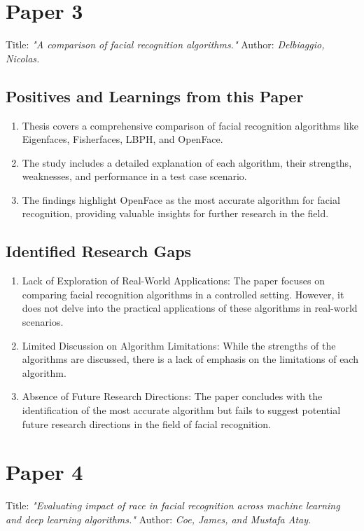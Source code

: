 \documentclass[openany]{report}
\begin{document}
\section{Paper 3}
Title:  \textit{"A comparison of facial recognition algorithms."}
Author:  \textit{Delbiaggio, Nicolas. }
\cite{9}
\subsection{Positives and Learnings from this Paper}
\begin{enumerate}
    \item Thesis covers a comprehensive comparison of facial recognition algorithms like Eigenfaces, Fisherfaces, LBPH, and OpenFace.

    \item The study includes a detailed explanation of each algorithm, their strengths, weaknesses, and performance in a test case scenario.

    \item The findings highlight OpenFace as the most accurate algorithm for facial recognition, providing valuable insights for further research in the field.
\end{enumerate}
\subsection{Identified Research Gaps}
\begin{enumerate}
    \item Lack of Exploration of Real-World Applications: The paper focuses on comparing facial recognition algorithms in a controlled setting. However, it does not delve into the practical applications of these algorithms in real-world scenarios.

    \item Limited Discussion on Algorithm Limitations: While the strengths of the algorithms are discussed, there is a lack of emphasis on the limitations of each algorithm.

    \item Absence of Future Research Directions: The paper concludes with the identification of the most accurate algorithm but fails to suggest potential future research directions in the field of facial recognition.
\end{enumerate}

\section{Paper 4}
Title:  \textit{"Evaluating impact of race in facial recognition across machine learning and deep learning algorithms."}
Author:  \textit{Coe, James, and Mustafa Atay.}
\cite{10}
\end{document}
